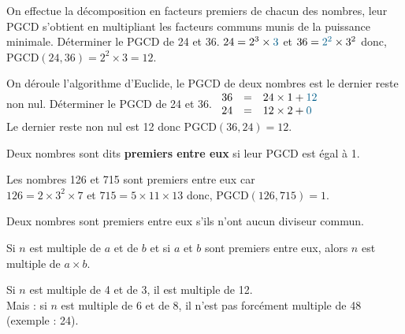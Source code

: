\begin{methode}
   On effectue la décomposition en facteurs premiers de chacun des nombres, leur PGCD s'obtient en multipliant les facteurs communs munis de la puissance minimale.
\exercice
   Déterminer le PGCD de 24 et 36.
\correction   
   $24 =2^3\times\textcolor{A1}{3}$ et $36 =\textcolor{A1}{2^2}\times3^2$ donc, PGCD$(24,36)=2^2\times3=12$. 
\end{methode}

\begin{methode}
   On déroule l'algorithme d'Euclide, le PGCD de deux nombres est le dernier reste non nul.
\exercice
   Déterminer le PGCD de 24 et 36.   
\correction
   {\renewcommand{\arraystretch}{1}
   $\begin{array}{rcll}
      36 & = & 24\times1 + \textcolor{A1}{12} \\
      24 & = & 12\times2 + \textcolor{A1}{0} \\
   \end{array}$} \\
   Le dernier reste non nul est 12 donc PGCD$(36,24)= 12$.
\end{methode}

\begin{definition}
   Deux nombres sont dits \textbf{premiers entre eux} si leur PGCD est égal à 1.
\end{definition}

\begin{exemple*1}
   Les nombres 126 et 715 sont premiers entre eux car \\
   $126 =2\times3^2\times7$ et $715 =5\times11\times13$ donc, PGCD$(126,715)=1$.
\end{exemple*1}

\begin{remarque}
   Deux nombres sont premiers entre eux s'ils n'ont aucun diviseur commun.
\end{remarque}

\begin{propriete}
   Si $n$ est multiple de $a$ et de $b$ et si $a$ et $b$ sont premiers entre eux, alors $n$ est multiple de $a\times b$.
\end{propriete}

\begin{exemple*1}
   Si $n$ est multiple de 4 et de 3, il est multiple de 12. \\
   Mais : si $n$ est multiple de 6 et de 8, il n'est pas forcément multiple de 48 (exemple : 24).
\end{exemple*1}

